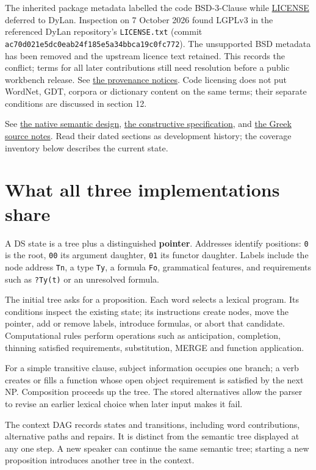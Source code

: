 \documentclass[11pt,a4paper]{article}
\begin{document}
The inherited package metadata labelled the code BSD-3-Clause while
\href{../LICENSE}{LICENSE} deferred to DyLan. Inspection on 7 October
2026 found LGPLv3 in the referenced DyLan repository's
\texttt{LICENSE.txt} (commit
\nolinkurl{ac70d021e5dc0eab24f185e5a34bbca19c0fc772}). The unsupported
BSD metadata has been removed and the upstream licence text retained.
This records the conflict; terms for all later contributions still need
resolution before a public workbench release. See
\href{../THIRD_PARTY_NOTICES.md}{the provenance notices}. Code licensing
does not put WordNet, GDT, corpora or dictionary content on the same
terms; their separate conditions are discussed in section 12.

See \href{design/native-semantics.md}{the native semantic design},
\href{design/constructive-ds-design.md}{the constructive specification},
and \href{design/greek-clitics.md}{the Greek source notes}. Read their
dated sections as development history; the coverage inventory below
describes the current state.

\section{What all three implementations
share}\label{what-all-three-implementations-share}

A DS state is a tree plus a distinguished \textbf{pointer}. Addresses
identify positions: \texttt{0} is the root, \texttt{00} its argument
daughter, \texttt{01} its functor daughter. Labels include the node
address \texttt{Tn}, a type \texttt{Ty}, a formula \texttt{Fo},
grammatical features, and requirements such as \texttt{?Ty(t)} or an
unresolved formula.

The initial tree asks for a proposition. Each word selects a lexical
program. Its conditions inspect the existing state; its instructions
create nodes, move the pointer, add or remove labels, introduce
formulas, or abort that candidate. Computational rules perform
operations such as anticipation, completion, thinning satisfied
requirements, substitution, MERGE and function application.

For a simple transitive clause, subject information occupies one branch;
a verb creates or fills a function whose open object requirement is
satisfied by the next NP. Composition proceeds up the tree. The stored
alternatives allow the parser to revise an earlier lexical choice when
later input makes it fail.

The context DAG records states and transitions, including word
contributions, alternative paths and repairs. It is distinct from the
semantic tree displayed at any one step. A new speaker can continue the
same semantic tree; starting a new proposition introduces another tree
in the context.
\end{document}
